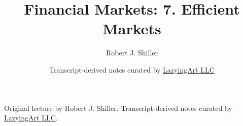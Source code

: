\documentclass[11pt,oneside]{book}
\begin{document}
\frontmatter
\title{Financial Markets: 7. Efficient Markets}
\author{Robert J. Shiller}
\date{Transcript-derived notes curated by \href{https://lazying.art}{LazyingArt LLC}}
\maketitle
\begin{center}
\small Original lecture by Robert J. Shiller. Transcript-derived notes curated by \href{https://lazying.art}{LazyingArt LLC}.
\end{center}
\clearpage
\mainmatter

\end{document}
